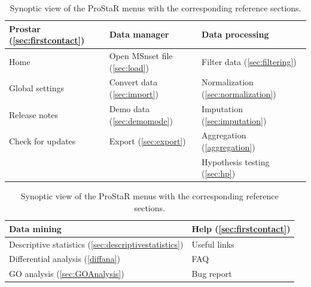 \documentclass[12pt]{article}
\begin{document}
\begin{table}
{\normalsize
		\begin{tabular}{|l|l|l|}
				\hline
		\cellcolor{black}\textbf{\textcolor[rgb]{1,1,1}{Prostar (\ref{sec:firstcontact})}} &	
		\cellcolor{black}\textbf{\textcolor[rgb]{1,1,1}{Data manager}} &	
		\cellcolor{black}\textbf{\textcolor[rgb]{1,1,1}{Data processing}} \\
		\hline
		Home &	Open MSnset file (\ref{sec:load}) &	Filter data (\ref{sec:filtering})  \\	
		Global settings	& Convert data (\ref{sec:import}) & Normalization (\ref{sec:normalization})  \\
		Release notes &	Demo data (\ref{sec:demomode}) &	Imputation (\ref{sec:imputation})  \\
		Check for updates & Export (\ref{sec:export}) &	Aggregation (\ref{aggregation})	 \\
		& &	Hypothesis testing (\ref{sec:hp})	 \\
		\hline
		\end{tabular} \newline \bigskip
		
	\begin{tabular}{|l|l|}
				\hline
		\cellcolor{black}\textbf{\textcolor[rgb]{1,1,1}{Data mining}}	& 
		\cellcolor{black}\textbf{\textcolor[rgb]{1,1,1}{Help (\ref{sec:firstcontact})}} \\
		\hline
		Descriptive statistics (\ref{sec:descriptivestatistics}) &	Useful links \\	
		Differential analysis (\ref{diffana}) &	FAQ \\
		GO analysis (\ref{sec:GOAnalysis}) &	Bug report\\
		\hline
		\end{tabular}
	}
	\caption{Synoptic view of the ProStaR menus with the corresponding reference sections.}
	\label{tab:LoMenus}
\end{table}
\end{document}

